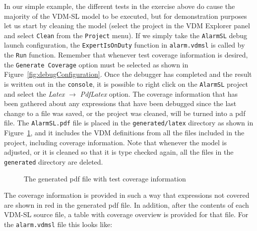 In our simple example, the different tests in the exercise above do cause the majority of the VDM-SL model to be executed, but for demonstration purposes let us start by cleaning the model (select the project in the VDM Explorer panel and select \texttt{Clean} from the \texttt{Project} menu). If we simply take the \texttt{AlarmSL} debug launch configuration, the \verb|ExpertIsOnDuty| function in \verb|alarm.vdmsl| is called by the \texttt{Run} function. Remember that whenever test coverage information is desired, the \texttt{Generate Coverage} option must be selected as shown in Figure~\ref{fig:debugConfiguration}.  Once the debugger has completed and the result is written out in the \texttt{console}, it is possible to right click on the \texttt{AlarmSL} project and select the \emph{Latex} $\rightarrow $ \emph{PdfLatex} option.  The coverage information that has been gathered about any expressions that have been debugged since the last change to a file was saved, or the project was cleaned, will be turned into a pdf file. The \texttt{AlarmSL.pdf} file is placed in the \texttt{generated/latex} directory as shown in Figure~\ref{fig:testcov}, and it includes the VDM definitions from all the files included in the project, including coverage information. Note that whenever the model is adjusted, or it is cleaned so that it is type checked again, all the files in the \texttt{generated} directory are deleted.
%
\begin{figure}[tb]
\begin{center}
\end{center}
\caption{The generated pdf file with test coverage information\label{fig:testcov}}
\end{figure}
%
The coverage information is provided in such a way that expressions not covered are shown in red in the generated pdf file. In addition, after the contents of each VDM-SL source file, a table with coverage overview is provided for that file. For the \texttt{alarm.vdmsl} file this looks like:

